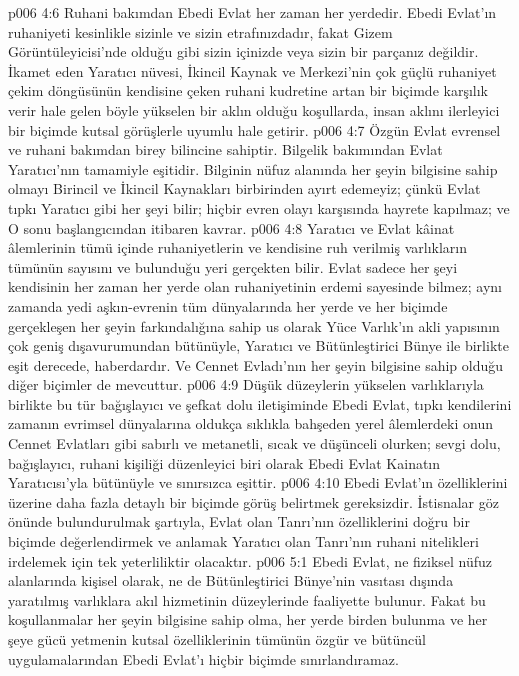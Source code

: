 \vs p006 4:6 Ruhani bakımdan Ebedi Evlat her zaman her yerdedir. Ebedi Evlat’ın ruhaniyeti kesinlikle sizinle ve sizin etrafınızdadır, fakat Gizem Görüntüleyicisi’nde olduğu gibi sizin içinizde veya sizin bir parçanız değildir. İkamet eden Yaratıcı nüvesi, İkincil Kaynak ve Merkezi’nin çok güçlü ruhaniyet çekim döngüsünün kendisine çeken ruhani kudretine artan bir biçimde karşılık verir hale gelen böyle yükselen bir aklın olduğu koşullarda, insan aklını ilerleyici bir biçimde kutsal görüşlerle uyumlu hale getirir.
\vs p006 4:7 Özgün Evlat evrensel ve ruhani bakımdan birey bilincine sahiptir. Bilgelik bakımından Evlat Yaratıcı’nın tamamiyle eşitidir. Bilginin nüfuz alanında her şeyin bilgisine sahip olmayı Birincil ve İkincil Kaynakları birbirinden ayırt edemeyiz; çünkü Evlat tıpkı Yaratıcı gibi her şeyi bilir; hiçbir evren olayı karşısında hayrete kapılmaz; ve O sonu başlangıcından itibaren kavrar.
\vs p006 4:8 Yaratıcı ve Evlat kâinat âlemlerinin tümü içinde ruhaniyetlerin ve kendisine ruh verilmiş varlıkların tümünün sayısını ve bulunduğu yeri gerçekten bilir. Evlat sadece her şeyi kendisinin her zaman her yerde olan ruhaniyetinin erdemi sayesinde bilmez; aynı zamanda yedi aşkın\hyp{}evrenin tüm dünyalarında her yerde ve her biçimde gerçekleşen her şeyin farkındalığına sahip us olarak Yüce Varlık’ın akli yapısının çok geniş dışavurumundan bütünüyle, Yaratıcı ve Bütünleştirici Bünye ile birlikte eşit derecede, haberdardır. Ve Cennet Evladı’nın her şeyin bilgisine sahip olduğu diğer biçimler de mevcuttur.
\vs p006 4:9 Düşük düzeylerin yükselen varlıklarıyla birlikte bu tür bağışlayıcı ve şefkat dolu iletişiminde Ebedi Evlat, tıpkı kendilerini zamanın evrimsel dünyalarına oldukça sıklıkla bahşeden yerel âlemlerdeki onun Cennet Evlatları gibi sabırlı ve metanetli, sıcak ve düşünceli olurken; sevgi dolu, bağışlayıcı, ruhani kişiliği düzenleyici biri olarak Ebedi Evlat Kainatın Yaratıcısı’yla bütünüyle ve sınırsızca eşittir.
\vs p006 4:10 Ebedi Evlat’ın özelliklerini üzerine daha fazla detaylı bir biçimde görüş belirtmek gereksizdir. İstisnalar göz önünde bulundurulmak şartıyla, Evlat olan Tanrı’nın özelliklerini doğru bir biçimde değerlendirmek ve anlamak Yaratıcı olan Tanrı’nın ruhani nitelikleri irdelemek için tek yeterliliktir olacaktır.
\vs p006 5:1 Ebedi Evlat, ne fiziksel nüfuz alanlarında kişisel olarak, ne de Bütünleştirici Bünye’nin vasıtası dışında yaratılmış varlıklara akıl hizmetinin düzeylerinde faaliyette bulunur. Fakat bu koşullanmalar  her şeyin bilgisine sahip olma, her yerde birden bulunma ve her şeye gücü yetmenin kutsal özelliklerinin tümünün özgür ve bütüncül uygulamalarından Ebedi Evlat’ı hiçbir biçimde sınırlandıramaz.
